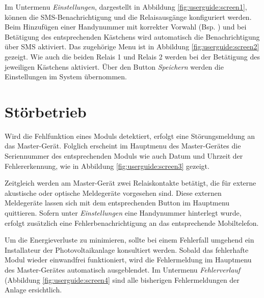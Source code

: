 Im     Untermenu     \emph{Einstellungen},    dargestellt     in     Abbildung
\ref{fig:userguide:screen1},   k\"onnen  die   SMS-Benachrichtigung  und   die
Relaisausg\"ange konfiguriert werden. Beim  Hinzuf\"ugen einer Handynummer mit
korrekter Vorwahl  (Bsp. ) und bei  Bet\"atigung des
entsprechenden K\"astchens   wird automatisch die Benachrichtigung  \"uber SMS
aktiviert. Das zugeh\"orige Menu  ist in Abbildung \ref{fig:userguide:screen2}
gezeigt. Wie auch die beiden Relais 1 und Relais 2 werden bei der Bet\"atigung
des jeweiligen K\"astchens aktiviert. \"Uber den Button \emph{Speichern} werden
die Einstellungen im System \"ubernommen.


\section{St\"orbetrieb}
\label{sec:userguide:errors}

Wird die Fehlfunktion eines  Moduls detektiert, erfolgt eine St\"orungsmeldung
an das  Master-Ger\"at. Folglich erscheint  im Hauptmenu  des Master-Ger\"ates
die  Seriennummer des  entsprechenden Moduls  wie auch  Datum und  Uhrzeit der
Fehlererkennung, wie in Abbildung \ref{fig:userguide:screen3} gezeigt.

Zeitgleich  werden  am  Master-Ger\"at  zwei  Relaiskontakte  bet\"atigt,  die
f\"ur externe  akustische oder  optische Meldeger\"ate  vorgesehen sind. Diese
externen Meldeger\"ate lassen sich mit  dem entsprechenden Button im Hauptmenu
quittieren. Sofern  unter  \emph{Einstellungen}  eine  Handynummer  hinterlegt
wurde, erfolgt  zus\"atzlich eine Fehlerbenachrichtigung an  das entsprechende
Mobiltelefon.

Um die Energieverluste zu minimieren, sollte bei einem Fehlerfall umgehend ein
Installateur der Photovoltaikanlage konsultiert werden. Sobald das fehlerhafte
Modul wieder einwandfrei funktioniert, wird die Fehlermeldung im Hauptmenu des
Master-Ger\"ates  automatisch ausgeblendet. Im  Untermenu \emph{Fehlerverlauf}
(Abbildung  \ref{fig:userguide:screen4} sind  alle bisherigen  Fehlermeldungen
der Anlage ersichtlich.


